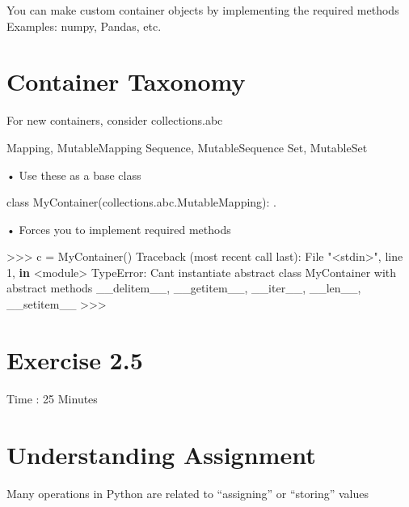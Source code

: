 \documentclass[
  letterpaper,
  DIV=11,
  numbers=noendperiod]{scrreprt}
\newenvironment{Shaded}{\begin{snugshade}}{\end{snugshade}}
\newcommand{\DecValTok}[1]{\textcolor[rgb]{0.68,0.00,0.00}{#1}}
\newcommand{\ErrorTok}[1]{\textcolor[rgb]{0.68,0.00,0.00}{#1}}
\newcommand{\KeywordTok}[1]{\textcolor[rgb]{0.00,0.23,0.31}{\textbf{#1}}}
\newcommand{\NormalTok}[1]{\textcolor[rgb]{0.00,0.23,0.31}{#1}}
\newcommand{\OperatorTok}[1]{\textcolor[rgb]{0.37,0.37,0.37}{#1}}
\newcommand{\PreprocessorTok}[1]{\textcolor[rgb]{0.68,0.00,0.00}{#1}}
\newcommand{\StringTok}[1]{\textcolor[rgb]{0.13,0.47,0.30}{#1}}
\begin{document}
You can make custom container objects by implementing the required
methods\\
Examples: numpy, Pandas, etc.


\chapter{Container Taxonomy}\label{container-taxonomy}

For new containers, consider collections.abc

Mapping, MutableMapping Sequence, MutableSequence Set, MutableSet

• Use these as a base class

class MyContainer(collections.abc.MutableMapping): .

• Forces you to implement required methods

\begin{Shaded}
\begin{Highlighting}[]
\OperatorTok{\textgreater{}\textgreater{}\textgreater{}}\NormalTok{ c }\OperatorTok{=}\NormalTok{ MyContainer()}
\NormalTok{Traceback (most recent call last):}
\NormalTok{    File }\StringTok{"\textless{}stdin\textgreater{}"}\NormalTok{, line }\DecValTok{1}\NormalTok{, }\KeywordTok{in} \OperatorTok{\textless{}}\NormalTok{module}\OperatorTok{\textgreater{}}
\PreprocessorTok{TypeError}\NormalTok{: Can}\StringTok{\textquotesingle{}t instantiate abstract class MyContainer with abstract methods \_\_delitem\_\_, \_\_getitem\_\_, \_\_iter\_\_, \_\_len\_\_, \_\_setitem\_\_}
\ErrorTok{\textgreater{}\textgreater{}\textgreater{} }
\end{Highlighting}
\end{Shaded}


\chapter{Exercise 2.5}\label{exercise-2.5}

Time : 25 Minutes


\chapter{Understanding Assignment}\label{understanding-assignment}

Many operations in Python are related to ``assigning'' or ``storing''
values
\end{document}
